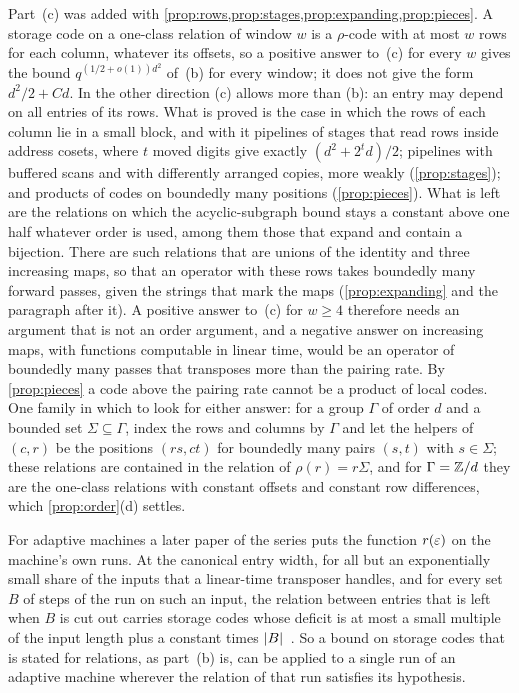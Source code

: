 Part~(c) was added with \cref{prop:rows,prop:stages,prop:expanding,prop:pieces}. A storage code on a one-class
relation of window $w$ is a $\rho$-code with at most $w$ rows for each column, whatever its offsets, so a positive
answer to~(c) for every $w$ gives the bound $q^{(1/2+o(1))d^2}$ of~(b) for every window; it does not give the form
$d^2/2+Cd$. In the other direction (c) allows more than (b): an entry may depend on all entries of its rows. What is
proved is the case in which the rows of each column lie in a small block, and with it pipelines of stages that read
rows inside address cosets, where $t$ moved digits give exactly $(d^2+2^td)/2$; pipelines with buffered scans and
with differently arranged copies, more weakly (\cref{prop:stages}); and products of codes on boundedly many positions
(\cref{prop:pieces}). What is left are the relations on which the acyclic-subgraph bound stays a constant above one
half whatever order is used, among them those that expand and contain a bijection. There are such relations that are
unions of the identity and three increasing maps, so that an operator with these rows takes boundedly many forward
passes, given the strings that mark the maps (\cref{prop:expanding} and the paragraph after it). A positive answer
to~(c) for $w\ge4$ therefore needs an argument that is
not an order argument, and a negative answer on increasing maps, with functions computable in linear time, would be
an operator of boundedly many passes that transposes more than the pairing rate. By \cref{prop:pieces} a code above
the pairing rate cannot be a product of local codes. One family in which to look for either answer: for a group
$\Gamma$ of order $d$ and a bounded set $\Sigma\subseteq\Gamma$, index the rows and columns by $\Gamma$ and let the
helpers of $(c,r)$ be the positions $(rs,ct)$ for boundedly many pairs $(s,t)$ with $s\in\Sigma$; these relations
are contained in the relation of $\rho(r)=r\Sigma$, and for $\Gamma=\mathbb{Z}/d$ they are the one-class relations with
constant offsets and constant row differences, which \cref{prop:order}(d) settles.

For adaptive machines a later paper of the series puts the function $r(\varepsilon)$ on the machine's own runs. At the
canonical entry width, for all but an exponentially small share of the inputs that a linear-time transposer handles,
and for every set $B$ of steps of the run on such an input, the relation between entries that is left when $B$ is cut
out carries storage codes whose deficit is at most a small multiple of the input length plus a constant times
$\lvert B \rvert$~\cite[Theorem~H.5 and Corollary~H.6]{AdaptiveTransfer2026}. So a bound on storage codes that is stated for
relations, as part~(b) is, can be applied to a single run of an adaptive machine wherever the relation of that run
satisfies its hypothesis.

